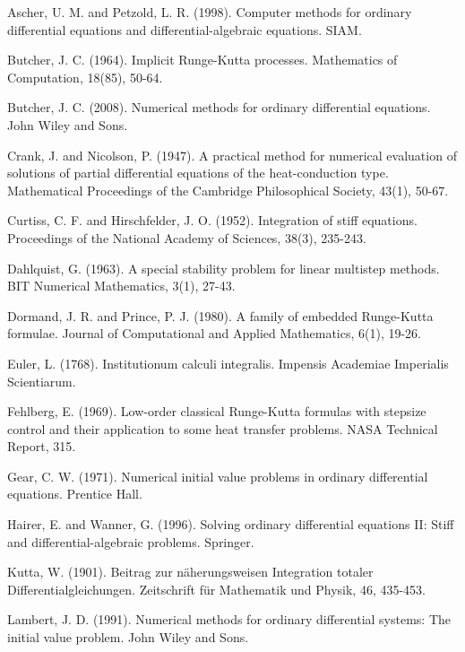 \documentclass[11pt,a4paper]{article}
\begin{document}
\begin{thebibliography}{99}

 Ascher, U. M. and Petzold, L. R. (1998). Computer methods for ordinary differential equations and differential-algebraic equations. SIAM.

 Butcher, J. C. (1964). Implicit Runge-Kutta processes. Mathematics of Computation, 18(85), 50-64.

 Butcher, J. C. (2008). Numerical methods for ordinary differential equations. John Wiley and Sons.

 Crank, J. and Nicolson, P. (1947). A practical method for numerical evaluation of solutions of partial differential equations of the heat-conduction type. Mathematical Proceedings of the Cambridge Philosophical Society, 43(1), 50-67.

 Curtiss, C. F. and Hirschfelder, J. O. (1952). Integration of stiff equations. Proceedings of the National Academy of Sciences, 38(3), 235-243.

 Dahlquist, G. (1963). A special stability problem for linear multistep methods. BIT Numerical Mathematics, 3(1), 27-43.

 Dormand, J. R. and Prince, P. J. (1980). A family of embedded Runge-Kutta formulae. Journal of Computational and Applied Mathematics, 6(1), 19-26.

 Euler, L. (1768). Institutionum calculi integralis. Impensis Academiae Imperialis Scientiarum.

 Fehlberg, E. (1969). Low-order classical Runge-Kutta formulas with stepsize control and their application to some heat transfer problems. NASA Technical Report, 315.

 Gear, C. W. (1971). Numerical initial value problems in ordinary differential equations. Prentice Hall.

 Hairer, E. and Wanner, G. (1996). Solving ordinary differential equations II: Stiff and differential-algebraic problems. Springer.

 Kutta, W. (1901). Beitrag zur n{\"a}herungsweisen Integration totaler Differentialgleichungen. Zeitschrift f{\"u}r Mathematik und Physik, 46, 435-453.

 Lambert, J. D. (1991). Numerical methods for ordinary differential systems: The initial value problem. John Wiley and Sons.


\end{thebibliography}
\end{document}
